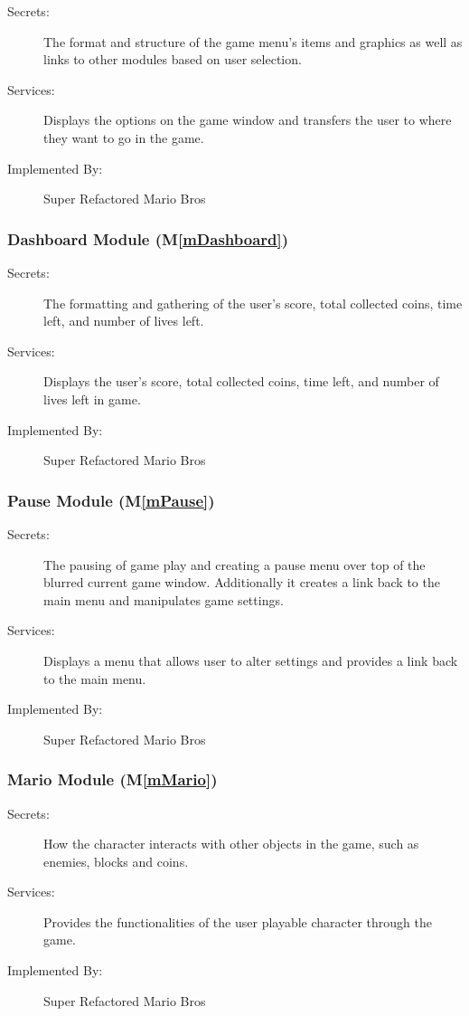 \documentclass[12pt, titlepage]{article}
\newcommand{\mref}[1]{M\ref{#1}}
\begin{document}
\begin{description}
\item[Secrets:] The format and structure of the game menu's items and graphics as well as links to other modules based on user selection.
\item[Services:] Displays the options on the game window and transfers the user to where they want to go in the game.
\item[Implemented By:] Super Refactored Mario Bros
\end{description}

\subsubsection{Dashboard Module (\mref{mDashboard})}

\begin{description}
\item[Secrets:] The formatting and gathering of the user's score, total collected coins, time left, and number of lives left.
\item[Services:] Displays the user's score, total collected coins, time left, and number of lives left in game.
\item[Implemented By:] Super Refactored Mario Bros
\end{description}

\subsubsection{Pause Module (\mref{mPause})}

\begin{description}
\item[Secrets:] The pausing of game play and creating a pause menu over top of the blurred current game window. Additionally it creates a link back to the main menu and manipulates game settings.
\item[Services:] Displays a menu that allows user to alter settings and provides a link back to the main menu.
\item[Implemented By:] Super Refactored Mario Bros
\end{description}

\subsubsection{Mario Module (\mref{mMario})}

\begin{description}
\item[Secrets:] How the character interacts with other objects in the game, such as enemies, blocks and coins.
\item[Services:] Provides the functionalities of the user playable character through the game.
\item[Implemented By:] Super Refactored Mario Bros
\end{description}
\end{document}
